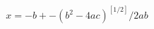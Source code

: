 \documentclass[preview]{standalone}
\begin{document}
\begin{align*}
x=-b +- (b^2-4ac)^[1/2]/2ab
\end{align*}
\end{document}
